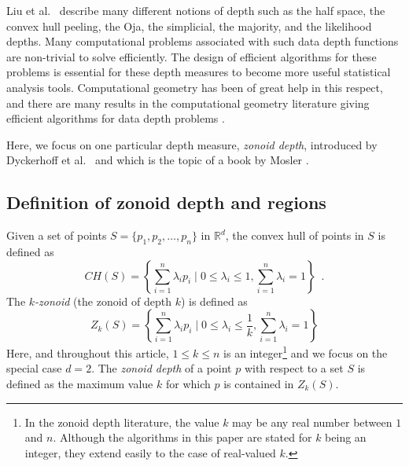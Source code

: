 \documentclass{elsart}
\begin{document}
Liu et al.\ \cite{multivariate_analysis_by_data_depth} describe many
different notions of depth such as the half space, the convex hull
peeling, the Oja, the simplicial, the majority, and the likelihood
depths. Many computational problems associated with such data depth
functions are non-trivial to solve efficiently.  The design of
efficient algorithms for these problems is essential for these depth
measures to become more useful statistical analysis tools.
Computational geometry \cite{preparata_book} has been of great help in
this respect, and there are many results in the computational geometry
literature giving efficient algorithms for data depth problems
\cite{regression_depth_and_center_points, aloupis_mcs_thesis,
algorithms_for_bivariate_medians_and_a_fermat_torricelli_problem_for_lines,
an_optimized_randomized_algorithm_for_maximum_tukey_depth,
on_khulls_and_related_problems,
zonoid_data_depth_theory_and_computation,
computing_the_centerpoint_of_a_finite_planar_set_of_points_in_linear_time,
on_a_triangle_counting_problem, langerman_phd_thesis,
the_complexity_of_hyperplane_depth_in_the_plane,
optimization_in_arrangements,
computing_the_center_of_planar_point_sets,
fast_implementation_of_depth_contours_using_topological_sweep,
statistical_algorithms_the_oja_bivariate_median,
efficient_algorithms_for_maximum_regression_depth,
a_lower_bound_for_computing_oja_depth,
on_the_computation_of_the_bivariate_median_and_a_fermat_torricelli_problem,
on_the_convex_layers_of_a_planar_set,
on_algorithms_for_simplicial_depth,
constructing_the_bivariate_tukey_median,
geometry_and_statistics_problems_at_the_interface,
some_new_algorithms_and_software_implementation_methods_for_pattern_recognition_research}.

Here, we focus on one particular depth measure, \emph{zonoid depth},
introduced by Dyckerhoff et al.\
\cite{zonoid_data_depth_theory_and_computation} and which is the topic
of a book by Mosler \cite{mosler_book}.

\subsection{Definition of zonoid depth and regions}
\label{subsection_definition_of_zonoid_depth_and_regions}

Given a set of points $S = \{p_1, p_2,\ldots, p_n\}$ in
$\mathbb{R}^d$, the convex hull of points in $S$ is defined as 
\[
   CH(S) = \left\{\sum_{i=1}^{n} \lambda_ip_i \mid 0 \le \lambda_i \le 1,
             \sum_{i=1}^{n}{\lambda_i} = 1\right\} \enspace . 
\] 
The \emph{$k$-zonoid} (the zonoid of depth $k$) is defined as
\[
   Z_k(S) = \left\{\sum_{i=1}^{n}\lambda_ip_i \mid 0 \le \lambda_i \le
             \frac{1}{k}, \sum_{i=1}^{n}{\lambda_i} = 1\right\}
\] 
Here, and throughout this article, $1 \le k \le n$ is an
integer\footnote{In the zonoid depth literature, the value $k$ may be
any real number between $1$ and $n$. Although the algorithms in this
paper are stated for $k$ being an integer, they extend easily to the
case of real-valued $k$.} and we focus on the special case $d=2$. The
\emph{zonoid depth} of a point $p$ with respect to a set $S$ is
defined as the maximum value $k$ for which $p$ is contained in
$Z_k(S)$.  
\end{document}
